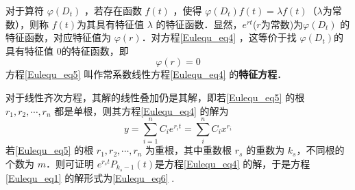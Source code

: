 对于算符 $\varphi(D_t)$ ，若存在函数 $f(t)$ ，使得
$\varphi(D_t)f(t)=\lambda f(t)$（$\lambda$为常数），则称 $f(t)$为其具有特征值 $\lambda$ 的特征函数．显然，$e^{rt}$($r$为常数)为$\varphi(D_t)$ 的特征函数，对应特征值为 $\varphi(r)$．对方程\autoref{Eulequ_eq4} ，这等价于找 $\varphi(D_t)$的具有特征值 $0$的特征函数，即
\begin{equation}\label{Eulequ_eq5}
\varphi(r)=0
\end{equation}
方程\autoref{Eulequ_eq5} 叫作常系数线性方程\autoref{Eulequ_eq4} 的\textbf{特征方程}．

对于线性齐次方程，其解的线性叠加仍是其解，即若\autoref{Eulequ_eq5} 的根 $r_1,r_2,\cdots,r_n$ 都是单根，则其方程\autoref{Eulequ_eq4} 的解为
\begin{equation}
y=\sum_{i=1}^{n}C_ie^{r_it}=\sum_i^{n}C_ix^{r_i}
\end{equation}
 若\autoref{Eulequ_eq5} 的根 $r_1,r_2,\cdots,r_n$ 为重根，其中重数根 $r_s$ 的重数为 $k_s$，不同根的个数为 $m$．则可证明 $e^{r_st}P_{k_s-1}(t)$是方程\autoref{Eulequ_eq4} 的解，于是方程\autoref{Eulequ_eq1} 的解形式为\autoref{Eulequ_eq6} .
